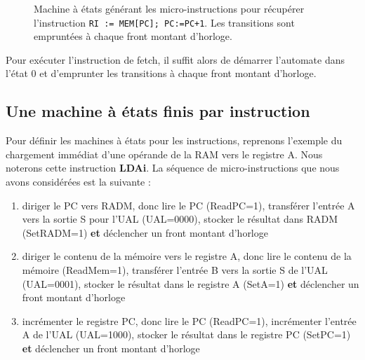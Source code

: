 \begin{figure}[htbp]
  \centering{}
  \caption{\label{fig:transducteur_fetch} Machine à états générant les micro-instructions pour récupérer l'instruction \texttt{RI := MEM[PC]; PC:=PC+1}. Les transitions sont empruntées à chaque front montant d'horloge.}
\end{figure}

Pour exécuter l'instruction de fetch, il suffit alors de démarrer l'automate dans l'état 0 et d'emprunter les transitions à chaque front montant d'horloge.

\subsection{Une machine à états finis par instruction}

Pour définir les machines à états pour les instructions, reprenons l'exemple du chargement immédiat d'une opérande de la RAM vers le registre A. Nous noterons cette instruction \textbf{LDAi}. La séquence de micro-instructions que nous avons considérées est la suivante :
\begin{enumerate}
\item diriger le PC vers RADM, donc lire le PC (ReadPC=1), transférer l'entrée A vers la sortie S pour l'UAL (UAL=0000), stocker le résultat dans RADM (SetRADM=1) \textbf{et} déclencher un front montant d'horloge
\item diriger le contenu de la mémoire vers le registre A, donc lire le contenu de la mémoire (ReadMem=1), transférer l'entrée B vers la sortie S de l'UAL (UAL=0001), stocker le résultat dans le registre A (SetA=1) \textbf{et} déclencher un front montant d'horloge
\item incrémenter le registre PC, donc lire le PC (ReadPC=1), incrémenter l'entrée A de l'UAL (UAL=1000), stocker le résultat dans le registre PC (SetPC=1) \textbf{et} déclencher un front montant d'horloge
\end{enumerate}

